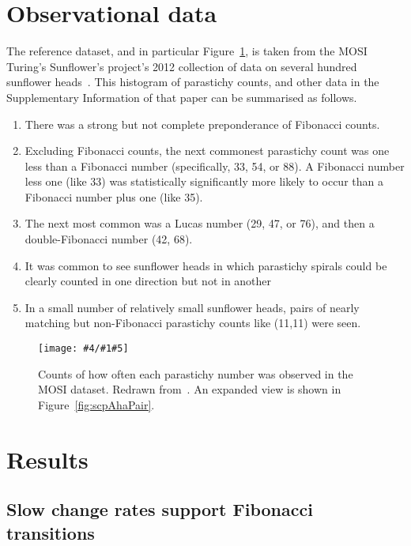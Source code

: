 \documentclass[a4paper,10pt]{amsart}
\newlength{\jfigwidth}
\newcommand{\pdffig}[3]{\jdofig{#1}{#2}{#3}{Figures}{.pdf}}
\newcommand{\jdofig}[5]{
	\begin{figure}\centering\texttt{[image: \#4/\#1\#5]} \caption{#2}\label{fig:#1}\end{figure}
}
\begin{document}
\section{Observational data}
The reference dataset, and in particular Figure~\ref{fig:scpMOSIHistogram},  is taken from the MOSI Turing's Sunflower's project's 2012 collection of data on several hundred sunflower heads~\cite{swintonNovelFibonacciNonFibonacci2016}.    This histogram of parastichy counts, and other data in the Supplementary Information of that paper can be summarised as follows.
\begin{enumerate}
	\item There was a strong but not complete preponderance of Fibonacci counts.
	\item	Excluding Fibonacci counts, the next commonest parastichy count was one less than a Fibonacci number (specifically, 33, 54, or 88).  A Fibonacci number less one (like 33) was statistically significantly more likely to occur than a Fibonacci number plus one (like 35).
	\item The next most common was a Lucas number (29, 47, or 76), and then a double-Fibonacci number (42, 68).
	\item It was common to see sunflower heads in which parastichy spirals could be clearly counted in one direction but not in another
	\item In a small number of relatively small sunflower heads, pairs of nearly matching but non-Fibonacci parastichy counts like (11,11)  were seen.
\end{enumerate}

\pdffig{scpMOSIHistogram}{Counts of how often each parastichy number  was observed in the MOSI dataset. Redrawn from~\cite{swintonNovelFibonacciNonFibonacci2016}. An expanded view is shown in Figure~\ref{fig:scpAhaPair}.}{1}


\section{Results}

 


\subsection{Slow change rates support Fibonacci transitions}
	
\end{document}
